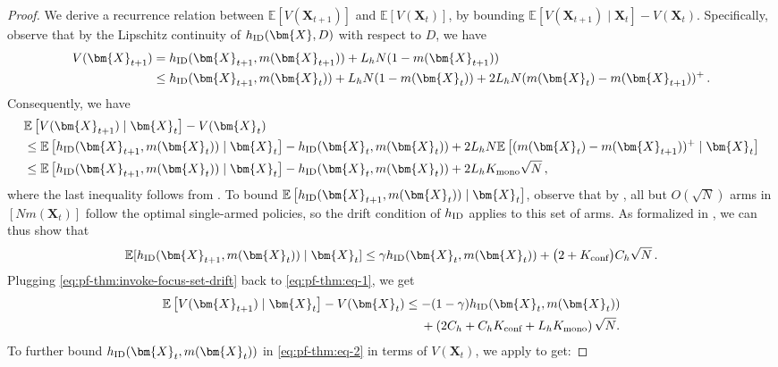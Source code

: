 \documentclass{article}
\theoremstyle{plain}
\theoremstyle{remark}
\newcommand{\E}[1]{\mathbb{E}\left[#1\right]}
\newcommand{\givenplain}{\;|\;}
\newcommand{\hid}{h_{\textnormal{ID}}}
\newcommand{\ID}{\textnormal{ID}}
\newcommand{\conf}{\text{conf}}
\newcommand{\mono}{\text{mono}}
\def\mX{{\bm{X}}}
\newcommand{\EE}{\mathbb{E}}
\newcommand{\mbracket}[1]{\left[#1\right]}
\begin{document}
\begin{proof}
We derive a recurrence relation between $\E{V(\mX_{t+1})}$ and $\E{V(\mX_t)}$, by bounding $\E{V(\mX_{t+1}) \givenplain \mX_t} - V(\mX_t)$. Specifically, observe that by the Lipschitz continuity of $\hid(\mX, D)$ with respect to $D$, we have
    \begin{align*}
        V(\mX_{t+1})
        &= h_{\ID}(\mX_{t+1},m(\mX_{t+1})) + L_hN(1-m(\mX_{t+1})) \\
        &\leq h_{\ID}(\mX_{t+1},m(\mX_t)) + L_hN(1-m(\mX_t)) + 2L_hN(m(\mX_t)-m(\mX_{t+1}))^+\,.
    \end{align*}
    Consequently, we have
    \begin{align}
        \nonumber
        &\EE\mbracket{V(\mX_{t+1}) \mid \mX_t}-V(\mX_t)\\
        \nonumber
        &\leq\EE\mbracket{h_{\ID}(\mX_{t+1},m(\mX_t)) \mid \mX_t}- h_{\ID}(\mX_t,m(\mX_t)) + 2L_hN\EE\mbracket{(m(\mX_t)-m(\mX_{t+1}))^+ \mid \mX_t}\\
        \label{eq:pf-thm:eq-1}
        &\leq \EE\mbracket{h_{\ID}(\mX_{t+1},m(\mX_t)) \mid \mX_t}- h_{\ID}(\mX_t,m(\mX_t)) + 2L_hK_{\mono}\sqrt{N}\,,
    \end{align}
    where the last inequality follows from . To bound $\EE\mbracket{h_{\ID}(\mX_{t+1},m(\mX_t)) \mid \mX_t}$, observe that by , all but $O(\sqrt{N})$ arms in $[Nm(\mX_t)]$ follow the optimal single-armed policies, so the drift condition of $\hid$ applies to this set of arms. As formalized in , we can thus show that
    \begin{align}
        \EE[h_{\ID}(\mX_{t+1},m(\mX_t))\givenplain \mX_t ]\leq \gamma h_{\ID}(\mX_t,m(\mX_t)) + \big(2 + K_{\conf}\big) C_h\sqrt{N}\,.\label{eq:pf-thm:invoke-focus-set-drift}
    \end{align}
    Plugging \eqref{eq:pf-thm:invoke-focus-set-drift} back to \eqref{eq:pf-thm:eq-1}, we get 
    \begin{equation}
    \label{eq:pf-thm:eq-2}
    \begin{aligned}
        \EE\mbracket{V(\mX_{t+1}) \mid \mX_t}-V(\mX_t)
        &\leq  -(1-\gamma) h_{\ID}(\mX_t,m(\mX_t))  \\
        &\mspace{23mu} + \left(2C_h+C_h K_{\conf} + L_hK_{\mono}\right)\sqrt{N}. 
    \end{aligned}
    \end{equation}
    To further bound $h_{\ID}(\mX_t,m(\mX_t))$ in \eqref{eq:pf-thm:eq-2} in terms of $V(\mX_t)$, we apply  to get: 

\end{proof}
\end{document}
